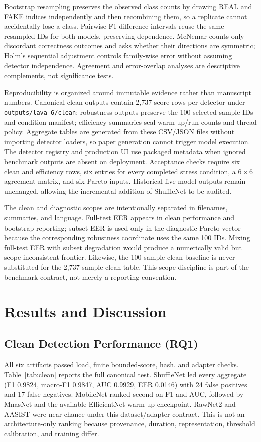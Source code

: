 \documentclass[10pt,journal,onecolumn,a4paper]{IEEEtran}
\begin{document}
Bootstrap resampling preserves the observed class counts by drawing REAL and FAKE indices independently and then recombining them, so a replicate cannot accidentally lose a class. Pairwise F1-difference intervals reuse the same resampled IDs for both models, preserving dependence. McNemar counts only discordant correctness outcomes and asks whether their directions are symmetric; Holm's sequential adjustment controls family-wise error without assuming detector independence. Agreement and error-overlap analyses are descriptive complements, not significance tests.

Reproducibility is organized around immutable evidence rather than manuscript numbers. Canonical clean outputs contain 2,737 score rows per detector under \texttt{outputs/lava\_6/clean}; robustness outputs preserve the 100 selected sample IDs and condition manifest; efficiency summaries seal warm-up/run counts and thread policy. Aggregate tables are generated from these CSV/JSON files without importing detector loaders, so paper generation cannot trigger model execution. The detector registry and production UI use packaged metadata when ignored benchmark outputs are absent on deployment. Acceptance checks require six clean and efficiency rows, six entries for every completed stress condition, a $6\times6$ agreement matrix, and six Pareto inputs. Historical five-model outputs remain unchanged, allowing the incremental addition of ShuffleNet to be audited.

The clean and diagnostic scopes are intentionally separated in filenames, summaries, and language. Full-test EER appears in clean performance and bootstrap reporting; subset EER is used only in the diagnostic Pareto vector because the corresponding robustness coordinate uses the same 100 IDs. Mixing full-test EER with subset degradation would produce a numerically valid but scope-inconsistent frontier. Likewise, the 100-sample clean baseline is never substituted for the 2,737-sample clean table. This scope discipline is part of the benchmark contract, not merely a reporting convention.

\section{Results and Discussion}
\subsection{Clean Detection Performance (RQ1)}
All six artifacts passed load, finite bounded-score, hash, and adapter checks. Table~\ref{tab:clean} reports the full canonical test. ShuffleNet led every aggregate (F1 0.9824, macro-F1 0.9847, AUC 0.9929, EER 0.0146) with 24 false positives and 17 false negatives. MobileNet ranked second on F1 and AUC, followed by MnasNet and the available EfficientNet warm-up checkpoint. RawNet2 and AASIST were near chance under this dataset/adapter contract. This is not an architecture-only ranking because provenance, duration, representation, threshold calibration, and training differ.
\end{document}
